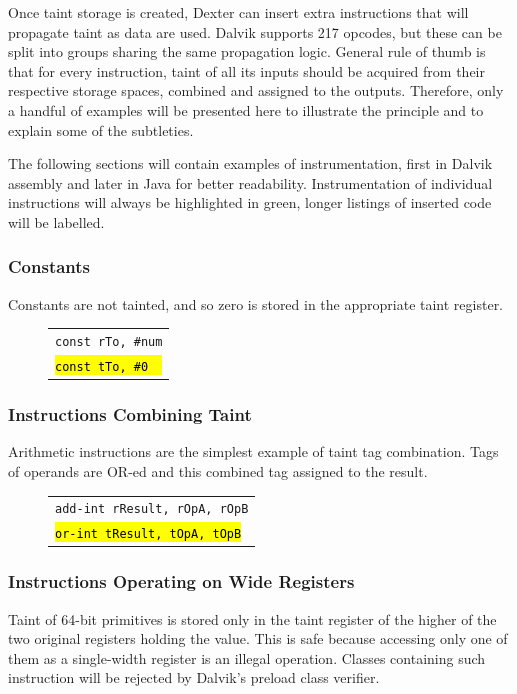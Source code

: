 \documentclass[12pt,twoside,notitlepage]{report}
\newcommand{\centerbox}[1] {
	\begin{center}
	\begin{footnotesize}
	\begin{tabular}{l}
		#1
	\end{tabular}
	\end{footnotesize}
	\end{center}
}
\newcommand{\asm}[1] {\texttt{#1}}
\newcommand{\asmExtra}[1] {\texttt{\hl{#1}}}
\begin{document}
Once taint storage is created, Dexter can insert extra instructions that will propagate taint as data are used. Dalvik supports 217 opcodes, but these can be split into groups sharing the same propagation logic. General rule of thumb is that for every instruction, taint of all its inputs should be acquired from their respective storage spaces, combined and assigned to the outputs. Therefore, only a handful of examples will be presented here to illustrate the principle and to explain some of the subtleties.

The following sections will contain examples of instrumentation, first in Dalvik assembly and later in Java for better readability. Instrumentation of individual instructions will always be highlighted in green, longer listings of inserted code will be labelled.

\subsubsection{Constants}

Constants are not tainted, and so zero is stored in the appropriate taint register.

	\begin{figure}[H]
		\centerbox{
			\asm{const rTo, \#num} \\
			\asmExtra{const tTo, \#0~~}
		}
	\end{figure}

\subsubsection{Instructions Combining Taint}

Arithmetic instructions are the simplest example of taint tag combination. Tags of operands are OR-ed and this combined tag assigned to the result.

	\begin{figure}[H]
		\centerbox{
			\asm{add-int rResult, rOpA, rOpB} \\
			\asmExtra{or-int tResult, tOpA, tOpB}
		}
	\end{figure}

\subsubsection{Instructions Operating on Wide Registers}

Taint of 64-bit primitives is stored only in the taint register of the higher of the two original registers holding the value. This is safe because accessing only one of them as a single-width register is an illegal operation. Classes containing such instruction will be rejected by Dalvik's preload class verifier.
\end{document}
